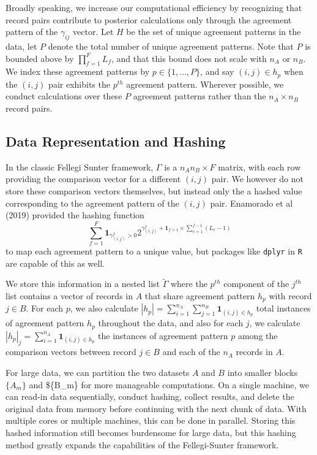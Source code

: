 \documentclass[
  12pt,
]{article}
\begin{document}
Broadly speaking, we increase our computational efficiency by
recognizing that record pairs contribute to posterior calculations only
through the agreement pattern of the \(\gamma_{ij}\) vector. Let \(H\)
be the set of unique agreement patterns in the data, let \(P\) denote
the total number of unique agreement patterns. Note that \(P\) is
bounded above by \(\prod_{f=1}^F L_f\), and that this bound does not
scale with \(n_A\) or \(n_B\). We index these agreement patterns by
\(p \in \{1, \ldots, P\}\), and say \((i,j) \in h_p\) when the \((i,j)\)
pair exhibits the \(p^{th}\) agreement pattern. Wherever possible, we
conduct calculations over these \(P\) agreement patterns rather than the
\(n_A \times n_B\) record pairs.

\hypertarget{data-representation-and-hashing}{%
\subsection{Data Representation and
Hashing}\label{data-representation-and-hashing}}

In the classic Fellegi Sunter framework, \(\Gamma\) is a
\(n_A n_B \times F\) matrix, with each row providing the comparison
vector for a different \((i,j)\) pair. We however do not store these
comparison vectors themselves, but instead only the a hashed value
corresponding to the agreement pattern of the \((i, j)\) pair. Enamorado
et al (2019) provided the hashing function
\[\sum_{f=1}^F \mathbf{1}_{\gamma_{(i,j)}^f >0}2^{\gamma_{(i,j)}^f + \mathbf{1}_{f>1} \times \sum_{e=1}^{f-1}(L_e-1)}\]
to map each agreement pattern to a unique value, but packages like
\texttt{dplyr} in \texttt{R} are capable of this as well.

We store this information in a nested list \(\tilde{\Gamma}\) where the
\(p^{th}\) component of the \(j^{th}\) list contains a vector of records
in \(A\) that share agreement pattern \(h_p\) with record \(j \in B\).
For each \(p\), we also calculate
\(|h_p| = \sum_{i=1}^{n_A}\sum_{j=1}^{n_B} \mathbf{1}_{(i,j) \in h_p}\)
total instances of agreement pattern \(h_p\) throughout the data, and
also for each \(j\), we calculate
\(|h_p|_j = \sum_{i=1}^{n_A} \mathbf{1}_{(i,j) \in h_p}\) the instances
of agreement pattern \(p\) among the comparison vectors between record
\(j \in B\) and each of the \(n_A\) records in \(A\).

For large data, we can partition the two datasets \(A\) and \(B\) into
smaller blocks \(\{A_m\}\) and \$\{B\_m\} for more manageable
computations. On a single machine, we can read-in data sequentially,
conduct hashing, collect results, and delete the original data from
memory before continuing with the next chunk of data. With multiple
cores or multiple machines, this can be done in parallel. Storing this
hashed information still becomes burdensome for large data, but this
hashing method greatly expands the capabilities of the Fellegi-Sunter
framework.
\end{document}
